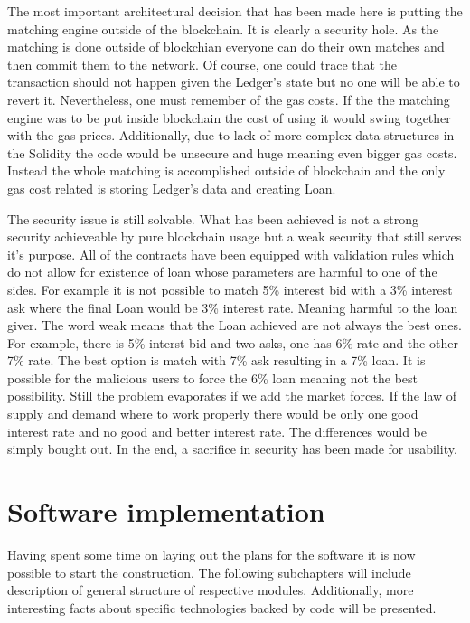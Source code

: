 \documentclass[a4paper,12pt,twoside,openany]{report}
\begin{document}
The most important architectural decision that has been made here is putting the matching engine outside of the blockchain. It is clearly a security hole. As the matching is done outside of blockchian everyone can do their own matches and then commit them to the network. Of course, one could trace that the transaction should not happen given the Ledger's state but no one will be able to revert it. Nevertheless, one must remember of the gas costs. If the the matching engine was to be put inside blockchain the cost of using it would swing together with the gas prices. Additionally, due to lack of more complex data structures in the Solidity the code would be unsecure and huge meaning even bigger gas costs. Instead the whole matching is accomplished outside of blockchain and the only gas cost related is storing Ledger's data and creating Loan. 

The security issue is still solvable. What has been achieved is not a strong security achieveable by pure blockchain usage but a weak security that still serves it's purpose. All of the contracts have been equipped with validation rules which do not allow for existence of loan whose parameters are harmful to one of the sides. For example it is not possible to match 5\% interest bid with a 3\% interest ask where the final Loan would be 3\% interest rate. Meaning harmful to the loan giver. The word weak means that the Loan achieved are not always the best ones. For example, there is 5\% interst bid and two asks, one has 6\% rate and the other 7\% rate. The best option is match with 7\% ask resulting in a 7\% loan. It is possible for the malicious users to force the 6\% loan meaning not the best possibility. Still the problem evaporates if we add the market forces. If the law of supply and demand where to work properly there would be only one good interest rate and no good and better interest rate. The differences would be simply bought out. In the end, a sacrifice in security has been made for usability.

\chapter{Software implementation}

Having spent some time on laying out the plans for the software it is now possible to start the construction. The following subchapters will include description of general structure of respective modules. Additionally, more interesting facts about specific technologies backed by code will be presented.
\end{document}
